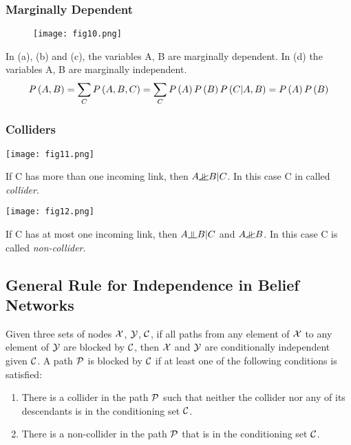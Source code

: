 \subsubsection*{Marginally Dependent}
\begin{figure*}[h]
	\centering
	\texttt{[image: fig10.png]}
\end{figure*}
In (a), (b) and (c), the variables A, B are marginally dependent.
In (d) the variables A, B are marginally independent.
\begin{align*}
\P{A,B}=\sum_C\P{A,B,C}=\sum_C\P{A}\P{B}\P{C|A,B}=\P{A}\P{B}
\end{align*}

\subsubsection*{Colliders}
\begin{minipage}{0.4\textwidth}
	\centering
	\texttt{[image: fig11.png]}
\end{minipage}
\begin{minipage}{0.6\textwidth}
	If C has more than one incoming link, then $A\nindep B|C$. In this case C in called \textit{collider}.
\end{minipage}
\begin{minipage}{0.4\textwidth}
	\centering
	\texttt{[image: fig12.png]}
\end{minipage}
\begin{minipage}{0.6\textwidth}
	If C has at most one incoming link, then $A\indep B|C$ and $A\nindep B$. In this case C is called \textit{non-collider}.
\end{minipage}

\subsection{General Rule for Independence in Belief Networks}

Given three sets of nodes $\cX$, $\cY$, $\cC$, if all paths from any element of $\cX$ to any element of $\cY$ are blocked by $\cC$, then $\cX$ and $\cY$ are conditionally independent given $\cC$.
A path $\cP$ is blocked by $\cC$ if at least one of the following conditions is satisfied:
	\begin{enumerate}
		\item There is a collider in the path $\cP$ such that neither the collider nor any of its descendants is in the conditioning set $\cC$.
		\item There is a non-collider in the path $\cP$ that is in the conditioning set $\cC$.
	\end{enumerate}

